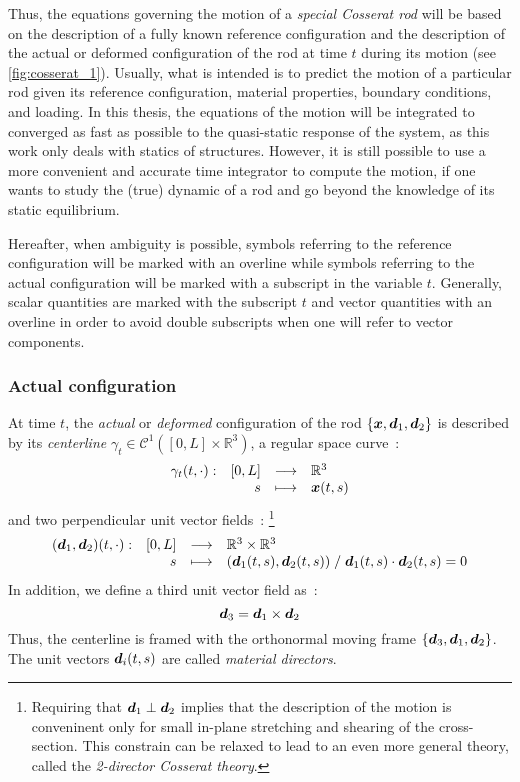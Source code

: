 Thus, the equations governing the motion of a \emph{special Cosserat rod} will be based on the description of a fully known reference configuration and the description of the actual or deformed configuration of the rod at time $t$ during its motion (see \cref{fig:cosserat_1}). Usually, what is intended is to predict the motion of a particular rod given its reference configuration, material properties, boundary conditions, and loading. In this thesis, the equations of the motion will be integrated to converged as fast as possible to the quasi-static response of the system, as this work only deals with statics of structures. However, it is still possible to use a more convenient and accurate time integrator to compute the motion, if  one wants to study the (true) dynamic of a rod and go beyond the knowledge of its static equilibrium.

Hereafter, when ambiguity is possible, symbols referring to the reference configuration will be marked with an overline while symbols referring to the actual configuration will be marked with a subscript in the variable $t$. Generally, scalar quantities are marked with the subscript $t$ and vector quantities with an overline in order to avoid double subscripts when one will refer to vector components.

\subsubsection{Actual configuration}

At time $t$, the \emph{actual} or \emph{deformed} configuration of the rod $\{{\boldsymbol{x}}, {\boldsymbol{d}_1}, {\boldsymbol{d}_2}\}$ is described by its \emph{centerline} $\gamma_t \in \mathcal{C}^1([0,{L}]\times \mathbb{R}^3)$, a regular space curve~: 
\begin{equation}
	\begin{array}{lrcl} \gamma_t(t, \cdot): & [0,{L}] & \longrightarrow & \mathbb{R}^3 \\ & {s} & \longmapsto & \boldsymbol{x}(t,{s}) \end{array}
\end{equation}
and two perpendicular unit vector fields~: \footnote{Requiring that  $\boldsymbol{d}_1 \perp \boldsymbol{d}_2$ implies that the description of the motion is conveninent only for small in-plane stretching and shearing of the cross-section. This constrain can be relaxed to lead to an even more general theory, called the \emph{2-director Cosserat theory}.}
\begin{equation}
	\begin{array}{lrcl} (\boldsymbol{d}_1,\boldsymbol{d}_2)(t, \cdot): & [0,{L}] & \longrightarrow & \mathbb{R}^3 \times \mathbb{R}^3 \\ & {s} & \longmapsto & (\boldsymbol{d}_1(t,{s}), \boldsymbol{d}_2(t,{s})) \; / \; 
	\boldsymbol{d}_1(t,{s}) \cdot \boldsymbol{d}_2(t,{s}) = 0
	 \end{array}
\end{equation}
In addition, we define a third unit vector field as~: 
\begin{equation}
	\boldsymbol{d}_3 = \boldsymbol{d}_1 \times \boldsymbol{d}_2
\end{equation}
Thus, the centerline is framed with the orthonormal moving frame $\{\boldsymbol{d}_3, \boldsymbol{d}_1, \boldsymbol{d}_2\}$. The unit vectors $\boldsymbol{d}_i(t,{s})$ are called \emph{material directors}.

